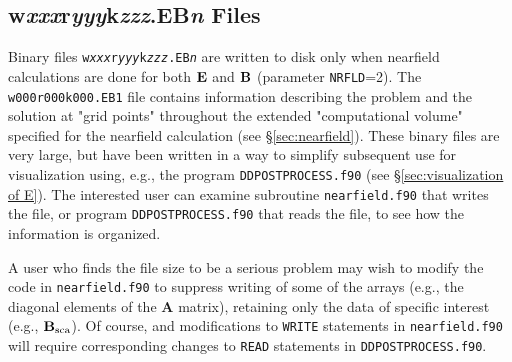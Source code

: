 \begin{appendix}
\section{{w{\it xxx}r{\it yyy}k{\it zzz}.EB{\it n}} Files
         \label{app:w000r000k000.En}}

Binary files {\tt w{\it xxx}r{\it yyy}k{\it zzz}.EB{\it n}} are written to disk
only when nearfield calculations are done for both ${\bf E}$ and ${\bf B}$
(parameter {\tt NRFLD}=2).
The {\tt w000r000k000.EB1} file contains information describing the problem and
the solution at "grid points" throughout the extended "computational volume" specified
for the nearfield calculation (see \S\ref{sec:nearfield}).
These binary files are very large, but have been written in a way to simplify
subsequent use for visualization using, e.g., 
the program {\tt DDPOSTPROCESS.f90}
(see \S\ref{sec:visualization of E}).
The interested user can examine subroutine {\tt nearfield.f90} that writes
the file, or
program {\tt DDPOSTPROCESS.f90} that reads the file, to see how the
information is organized.

A user who finds the file size to be a serious problem may wish to modify the
code in {\tt nearfield.f90} to suppress writing of some of the arrays
(e.g., the diagonal elements of the {\bf A} matrix), retaining only
the data of specific interest (e.g., ${\bf B}_{{\rm sca}}$).  Of course,
and modifications to {\tt WRITE} statements in {\tt nearfield.f90} will require corresponding
changes to {\tt READ} statements in {\tt DDPOSTPROCESS.f90}.
\end{appendix}
\newpage
{}
% 



